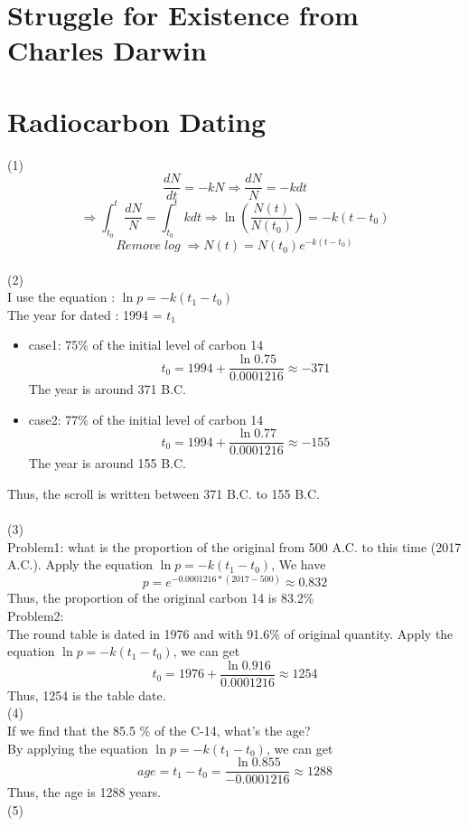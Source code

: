 \documentclass [24pt] {article}
\begin{document}
	\section {Struggle for Existence from Charles Darwin}
	\section {Radiocarbon Dating}
	(1)
	\[\frac{dN}{dt} = -kN \Rightarrow \frac{dN}{N} = -k dt\]
	\[\Rightarrow \int_{t_{0}}^{t}\frac{dN}{N} = \int_{t_0}^{t} k dt \Rightarrow \ln(\frac{N(t)}{N(t_0)}) = -k(t-t_0)\]
	\[Remove\; log\; \Rightarrow N(t) = N(t_0)e^{-k(t-t_0)}\]
	\vspace {16pt}
	\\(2)\\
	I use the equation : $\ln p = -k (t_1 - t_0)$\\
	The year for dated : 1994 = $t_1$\\
	\begin {itemize}
		\item case1: 75\% of the initial level of carbon 14
		\[t_0 = 1994 + \frac{\ln 0.75}{0.0001216} \approx -371\]
	The year is around 371 B.C.
		\item case2: 77\% of the initial level of carbon 14
	\[t_0 = 1994 + \frac{\ln 0.77}{0.0001216} \approx -155\]
	The year is around 155 B.C.
	\end {itemize}
	Thus, the scroll is written between 371 B.C. to 155 B.C.\\
	\vspace {16pt}
	\\(3)\\
	Problem1: what is the proportion of the original from 500 A.C. to this time (2017 A.C.). Apply the equation $\ln p = -k (t_1 - t_0)$, We have\\
	\[p = e^{-0.0001216 * (2017-500)} \approx 0.832\]
	Thus, the proportion of the original carbon 14 is 83.2\%\\
	Problem2:\\
	The round table is dated in 1976 and with 91.6\% of original quantity. Apply the equation $\ln p = -k (t_1 - t_0)$, we can get
	\[t_0 = 1976 + \frac{\ln 0.916}{0.0001216} \approx 1254\]
	Thus, 1254 is the table date.
	\vspace {16pt}
	\\(4)\\
	If we find that the 85.5 \% of the C-14, what's the age?\\
	By applying the equation $\ln p = -k (t_1 - t_0)$, we can get
	\[age = t_1 - t_0 = \frac{\ln 0.855}{-0.0001216} \approx 1288\]
	Thus, the age is 1288 years.
	\vspace {16pt}
	\\(5)\\
\end{document}
